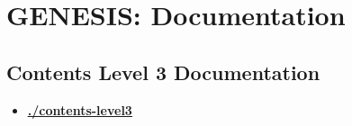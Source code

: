 \documentclass[12pt]{article}
\begin{document}
\section*{GENESIS: Documentation}

\subsection*{Contents Level 3 Documentation}

\begin{itemize}

\item \href{.././contents-level3/./contents-level3.pdf}{\bf \underline{./contents-level3}}


\end{itemize}

\end{document}
